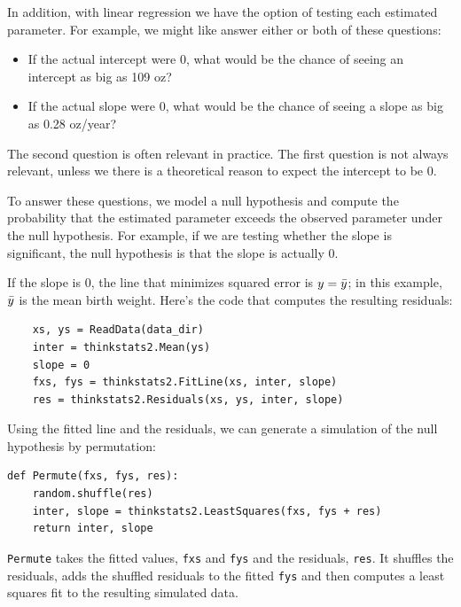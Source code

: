\documentclass[12pt]{book}
\begin{document}
In addition, with linear regression we have the option of testing
each estimated parameter.  For example, we might like answer either
or both of these questions:

\begin{itemize}

\item If the actual intercept were 0, what would be the chance of
seeing an intercept as big as 109 oz?

\item If the actual slope were 0, what would be the chance of seeing
a slope as big as 0.28 oz/year?

\end{itemize}

The second question is often relevant in practice.  The first question
is not always relevant, unless we there is a theoretical reason to
expect the intercept to be 0.

To answer these questions, we model a null hypothesis
and compute the probability that the estimated parameter exceeds
the observed parameter under the null hypothesis.  For example,
if we are testing whether the slope is significant, the null hypothesis
is that the slope is actually 0.

If the slope is 0, the line that minimizes squared error is
$y = \bar{y}$; in this example, $\bar{y}$ is the mean birth weight.
Here's the code that computes the resulting residuals:

\begin{verbatim}
    xs, ys = ReadData(data_dir)
    inter = thinkstats2.Mean(ys)
    slope = 0
    fxs, fys = thinkstats2.FitLine(xs, inter, slope)
    res = thinkstats2.Residuals(xs, ys, inter, slope)
\end{verbatim}

Using the fitted line and the residuals, we can generate a simulation
of the null hypothesis by permutation:

\begin{verbatim}
def Permute(fxs, fys, res):
    random.shuffle(res)
    inter, slope = thinkstats2.LeastSquares(fxs, fys + res)
    return inter, slope
\end{verbatim}

{\tt Permute} takes the fitted values, {\tt fxs} and {\tt fys} and the
residuals, {\tt res}.  It shuffles the residuals, adds the shuffled
residuals to the fitted {\tt fys} and then computes a least squares
fit to the resulting simulated data.
\end{document}
